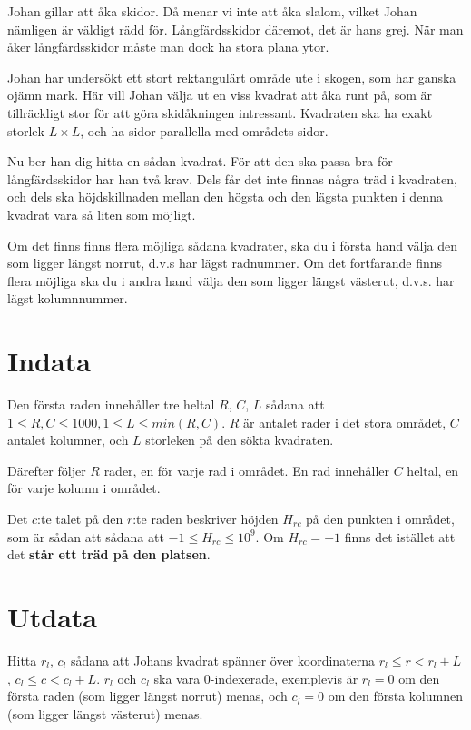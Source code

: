 Johan gillar att åka skidor.
Då menar vi inte att åka slalom, vilket Johan nämligen är väldigt rädd för.
Långfärdsskidor däremot, det är hans grej.
När man åker långfärdsskidor måste man dock ha stora plana ytor.

Johan har undersökt ett stort rektangulärt område ute i skogen, som har ganska ojämn mark.
Här vill Johan välja ut en viss kvadrat att åka runt på, som är tillräckligt stor för att göra skidåkningen intressant.
Kvadraten ska ha exakt storlek $L \times L$, och ha sidor parallella med områdets sidor.

Nu ber han dig hitta en sådan kvadrat.
För att den ska passa bra för långfärdsskidor har han två krav.
Dels får det inte finnas några träd i kvadraten, och dels ska höjdskillnaden mellan den högsta och den lägsta punkten i denna kvadrat vara så liten som möjligt.

Om det finns finns flera möjliga sådana kvadrater, ska du i första hand välja den som ligger längst norrut, d.v.s har lägst radnummer. Om det fortfarande finns flera möjliga
ska du i andra hand välja den som ligger längst västerut, d.v.s. har lägst kolumnnummer.

\section*{Indata}
Den första raden innehåller tre heltal $R$, $C$, $L$ sådana att $1\leq R,C \leq 1000, 1 \leq L \leq min(R,C)$.
$R$ är antalet rader i det stora området, $C$ antalet kolumner, och $L$ storleken på den sökta kvadraten.

Därefter följer $R$ rader, en för varje rad i området. En rad innehåller $C$ heltal, en för varje kolumn i området.

Det $c$:te talet på den $r$:te raden beskriver höjden $H_{rc}$ på den punkten i området, som är sådan att sådana att $-1 \leq H_{rc} \leq 10^9$.
Om $H_{rc} = -1$ finns det istället att det \textbf{står ett träd på den platsen}.

\section*{Utdata}
Hitta $r_l$, $c_l$ sådana att Johans kvadrat spänner över koordinaterna $r_l \leq r <r_l + L$, $c_l \leq c < c_l + L$. $r_l$ och $c_l$ ska vara 0-indexerade, exemplevis är $r_l = 0$ om den första raden (som ligger längst norrut) menas, och $c_l = 0$ om den första kolumnen (som ligger längst västerut) menas.

